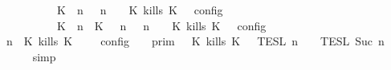 \begin{isabellebody}
\ \ \ \ \ \ \ \ \ \ {\isacharequal}\ {\isasymlbrakk}\ {\isacharparenleft}{\isacharparenleft}K\ {\isasymnot}{\isasymUp}\ n{\isacharparenright}\ {\isacharhash}\ {\isasymGamma}{\isacharparenright}{\isacharcomma}\ n\ {\isasymturnstile}\ {\isasymPsi}\ {\isasymtriangleright}\ {\isacharparenleft}{\isacharparenleft}K\ kills\ K\ {\isacharhash}\ {\isasymPhi}{\isacharparenright}\ {\isasymrbrakk}\isactrlsub c\isactrlsub o\isactrlsub n\isactrlsub f\isactrlsub i\isactrlsub g\isanewline
\ \ \ \ \ \ \ \ \ \ {\isasymunion}\ {\isasymlbrakk}\ {\isacharparenleft}{\isacharparenleft}K\ {\isasymUp}\ n{\isacharparenright}\ {\isacharhash}\ {\isacharparenleft}K\ {\isasymnot}{\isasymUp}\ {\isasymge}\ n{\isacharparenright}\ {\isacharhash}\ {\isasymGamma}{\isacharparenright}{\isacharcomma}\ n\ {\isasymturnstile}\ {\isasymPsi}\ {\isasymtriangleright}\ {\isacharparenleft}{\isacharparenleft}K\ kills\ K\ {\isacharhash}\ {\isasymPhi}{\isacharparenright}\ {\isasymrbrakk}\isactrlsub c\isactrlsub o\isactrlsub n\isactrlsub f\isactrlsub i\isactrlsub g{\isacartoucheclose}\isanewline
%
\isadelimproof
\ \ %
\endisadelimproof
%
\isatagproof
{}\isamarkupfalse%
\ {\isacharminus}\isanewline
\ \ \ \ \isamarkupfalse%
\ {\isacartoucheopen}{\isasymlbrakk}\ {\isasymGamma}{\isacharcomma}\ n\ {\isasymturnstile}\ {\isacharparenleft}{\isacharparenleft}K\ kills\ K\ {\isacharhash}\ {\isasymPsi}{\isacharparenright}\ {\isasymtriangleright}\ {\isasymPhi}\ {\isasymrbrakk}\isactrlsub c\isactrlsub o\isactrlsub n\isactrlsub f\isactrlsub i\isactrlsub g\ {\isacharequal}\ {\isasymlbrakk}{\isasymlbrakk}\ {\isasymGamma}\ {\isasymrbrakk}{\isasymrbrakk}\isactrlsub p\isactrlsub r\isactrlsub i\isactrlsub m\ {\isasyminter}\ {\isasymlbrakk}{\isasymlbrakk}\ {\isacharparenleft}K\ kills\ K\ {\isacharhash}\ {\isasymPsi}\ {\isasymrbrakk}{\isasymrbrakk}\isactrlsub T\isactrlsub E\isactrlsub S\isactrlsub L\isactrlbsup {\isasymge}\ n\isactrlesup \ {\isasyminter}\ {\isasymlbrakk}{\isasymlbrakk}\ {\isasymPhi}\ {\isasymrbrakk}{\isasymrbrakk}\isactrlsub T\isactrlsub E\isactrlsub S\isactrlsub L\isactrlbsup {\isasymge}\ Suc\ n\isactrlesup {\isacartoucheclose}\isanewline
\ \ \ \ \ \ \isamarkupfalse%
\ simp\isanewline
\ \ \ \ \isamarkupfalse%

\end{isabellebody}
